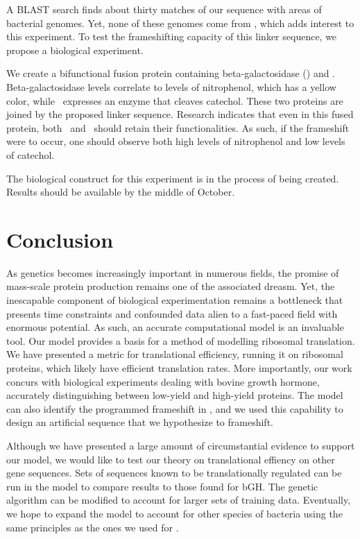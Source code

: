 \documentclass[12pt, draft]{article}
\numberwithin{equation}{section}
\begin{document}
A BLAST search finds about thirty matches of our sequence with areas of
bacterial genomes.  Yet, none of these genomes come from \ecoli, which 
adds interest to this experiment.  To test the frameshifting capacity of
this linker sequence, we propose a biological experiment.

We create a bifunctional fusion protein containing beta-galactosidase (\bgals) 
and \xylE.  Beta-galactosidase levels correlate to
levels of nitrophenol, which has a yellow color, while \xylE\ expresses
an enzyme that cleaves catechol.  These two proteins are joined by
the proposed linker sequence.  Research indicates that even in this
fused protein, both \bgals\ and \xylE\ should retain their functionalities.
As such, if the frameshift were to occur, one should observe both 
high levels of nitrophenol and low levels of catechol.

The biological construct for this experiment is in the process of being created.
Results should be available by the middle of October.

\section{Conclusion}

As genetics becomes increasingly important in numerous fields, the
promise of mass-scale protein production remains one of the associated dreasm.
Yet, the inescapable
component of biological experimentation remains a bottleneck that
presents time constraints and confounded data
alien to a fast-paced field with enormous potential. As such, an
accurate computational model is an invaluable tool. 
Our model provides a basis for a method of modelling ribosomal translation.
We have presented a metric for translational efficiency, running it on
ribosomal proteins, which likely have efficient translation rates.
More importantly, our work concurs with biological experiments dealing with bovine growth hormone,
accurately distinguishing between low-yield and high-yield proteins.
The model can also identify the programmed frameshift in \prfB,
and we used this capability to design an artificial sequence that we hypothesize to frameshift.

Although we have presented a large amount of circumstantial evidence
to support our model, we would like to test our theory on translational effiency
on other gene sequences.  Sets of sequences known to be translationally regulated
can be run in the model to compare results to those found for bGH.
The genetic algorithm can be modified to account for larger sets of training
data.  Eventually, we hope to expand the model to account for other species of
bacteria using the same principles as the ones we used for \ecoli.
\end{document}
